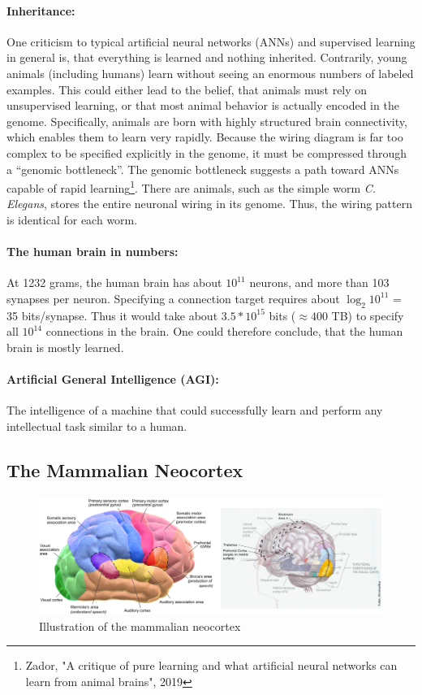 \documentclass[main]{subfiles}
\begin{document}
\paragraph{Inheritance:} One criticism to typical artificial neural networks (ANNs) and supervised learning in general is, that everything is learned and nothing inherited. Contrarily, young animals (including humans) learn without seeing an enormous numbers of labeled examples. This could either lead to the belief, that animals must rely on unsupervised learning, or that most animal behavior is actually encoded in the genome. Specifically, animals are born with highly structured brain connectivity, which enables them to learn very rapidly. Because the wiring diagram is far too complex to be specified explicitly in the genome, it must be compressed through a “genomic bottleneck”. The genomic bottleneck suggests a path toward ANNs capable of rapid learning\footnote{Zador, "A critique of pure learning and what artificial neural networks can learn from animal brains", 2019}. There are animals, such as the simple worm \textit{C. Elegans}, stores the entire neuronal wiring in its genome. Thus, the wiring pattern is identical for each worm. 

\paragraph{The human brain in numbers:} At 1232 grams, the human brain has about $10^{11}$ neurons, and more than 103 synapses per neuron. Specifying a connection target requires about $\log_2 10^{11}$ = 35 bits/synapse. Thus it would take about $3.5 * 10^{15}$ bits ($\approx 400$ TB) to specify all $10^{14}$ connections in the brain. One could therefore conclude, that the human brain is mostly learned.

\paragraph{Artificial General Intelligence (AGI):} The intelligence of a machine that could successfully learn and perform any intellectual task similar to a human.

\newpage
\subsection{The Mammalian Neocortex}
\begin{figure}[h]
    \centering
    \includegraphics[width=0.99\linewidth]{01_Introduction/figures/neocortex.png}
    \caption{Illustration of the mammalian neocortex}
    \label{fig:basalandcerebellum}
\end{figure}
\end{document}
